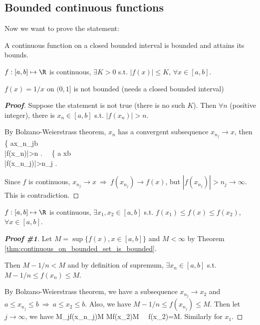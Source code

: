\subsection{Bounded continuous functions}

Now we want to prove the statement: 

A continuous function on a closed bounded interval is bounded and attains its bounds.

\begin{theorem}\label{thm:continuous_on_bounded_set_is_bounded}
$f: [a,b]\mapsto \R$ is continuous, $\exists K>0$ s.t. $|f(x)|\leq K$, $\forall x\in[a,b]$. 
\end{theorem}

\begin{note}
$f(x)=1/x$ on $(0,1]$ is not bounded (needs a closed bounded interval)
\end{note}

\begin{proof}[{\bf Proof}]
Suppose the statement is not true (there is no such $K$). Then $\forall n$ (positive integer), there is $x_n\in [a,b]$ s.t. $|f(x_n)|>n$.

By Bolzano-Weierstrass theorem, $x_n$ has a convergent subsequence $x_{n_j}\to x$, then 
\bea
\left\{
a\leq x_{n_j}\leq b \\
|f(x_n)|>n 
\ea\right. \ \Rightarrow \ 
\left\{
a \leq x\leq b \\
|f(x_{n_j})|>n_j \to \infty
\ea\right.
\eea

Since $f$ is continuous, $x_{n_j}\to x \ \Rightarrow \ f(x_{n_j})\to f(x)$, but $|f(x_{n_j})|>n_j \to \infty$. This is contradiction.
\end{proof}

\begin{theorem}\label{thm:conti_bound_2}
$f: [a,b]\mapsto \R$ is continuous, $\exists x_1,x_2\in [a,b]$ s.t. $f(x_1)\leq f(x) \leq f(x_2)$, $\forall x\in[a,b]$.
\end{theorem}

\begin{proof}[{\bf Proof \#1}]
Let $M=\sup\{f(x), x\in[a,b]\}$ and $M<\infty$ by Theorem \ref{thm:continuous_on_bounded_set_is_bounded}.

Then $M-1/n<M$ and by definition of supremum, $\exists x_n\in[a,b]$ s.t. $M-1/n\leq f(x_n)\leq M$.

By Bolzano-Weierstrass theorem, we have a subsequence $x_{n_j}\to x_2$ and $a\leq x_{n_j}\leq b \ \Rightarrow \ a \leq x_2\leq b$. Also, we have $M-1/n\leq f(x_{n_j})\leq M$. Then let $j\to \infty$, we have 
\be
M\leq \lim_{j\to \infty}f(x_{n_j})\leq M \quad {} \quad M\leq f(x_2)\leq M \ \Rightarrow \ f(x_2)=M.
\ee
Similarly for $x_1$.
\end{proof}

